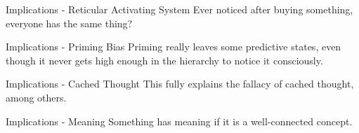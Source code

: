 \begin{frame}[c]{Implications - Reticular Activating System}
    \Large
    Ever noticed after buying something, \\
    everyone has the same thing?
\end{frame}


\begin{frame}[c]{Implications - Priming Bias}
    \Large
    \pause
    Priming really leaves some predictive states, even though it never gets
    high enough in the hierarchy to notice it consciously.
\end{frame}




\begin{frame}[c]{Implications - Cached Thought}
    This fully explains the fallacy of cached thought, among others.
\end{frame}


\begin{frame}[c]{Implications - Meaning}
    \Large
    Something has meaning if it is a well-connected concept.
\end{frame}










